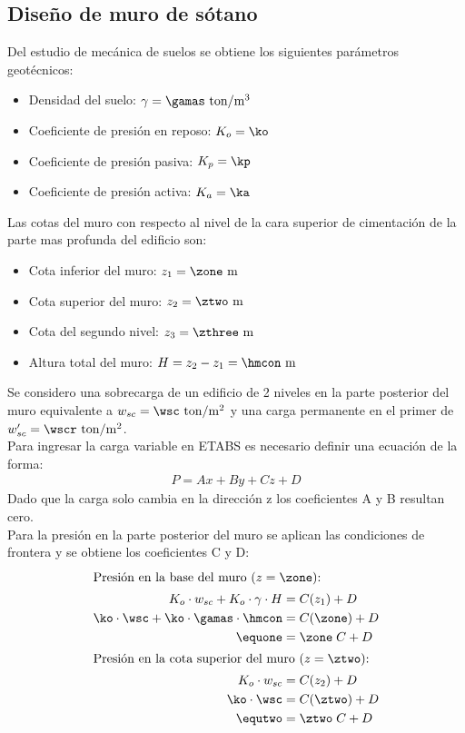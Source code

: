 \subsection{Diseño de muro de sótano}
Del estudio de mecánica de suelos se obtiene los siguientes parámetros geotécnicos:
\FPset{}
\FPset{}
\FPset{}
\FPset{}
\begin{itemize}
    \item Densidad del suelo: $\gamma =\gamas\mathrm{~ton/m^3}$
    \item Coeficiente de presión en reposo: $K_{o}=\ko$
    \item Coeficiente de presión pasiva: $K_{p}=\kp$
    \item Coeficiente de presión activa: $K_{a}=\ka$
\end{itemize}
Las cotas del muro con respecto al nivel de la cara superior de cimentación de la parte mas profunda del edificio son:
\FPset{}
\FPset{}
\FPset{}
\begin{itemize}
    \item Cota inferior del muro: $z_{1} =\zone\mathrm{~m}$
    \item Cota superior del muro: $z_{2}=\ztwo\mathrm{~m}$
    \item Cota del segundo nivel: $z_{3}=\zthree\mathrm{~m}$
    \item Altura total del muro: $H=z_{2}-z_{1}=\hmcon\mathrm{~m}$
\end{itemize}
\FPset{}
\FPset{}
Se considero una sobrecarga de un edificio de 2 niveles en la parte posterior del muro equivalente a $w_{sc}=\wsc\mathrm{~ton/m^2}$ y una carga permanente en el primer de $w_{sc}^{\prime}=\wscr\mathrm{~ton/m^2}$.\\
Para ingresar la carga variable en ETABS es necesario definir una ecuación de la forma:
\begin{align}
    P=Ax+By+Cz+D
\end{align}
Dado que la carga solo cambia en la dirección z los coeficientes A y B resultan cero.\\
Para la presión en la parte posterior del muro se aplican las condiciones de frontera y se obtiene los coeficientes C y D:
\begin{align}
\shortintertext{Presión en la base del muro ($z=\zone$):} K_{o}\cdot w_{sc}+K_{o}\cdot \gamma \cdot H&=C(z_{1})+D\notag\\
\ko\cdot \wsc+\ko\cdot \gamas \cdot \hmcon&=C(\zone)+D\notag\\
\equone&=\zone\; C+D\label{eq1}\\ \shortintertext{Presión en la cota superior del muro ($z=\ztwo$):}
K_{o}\cdot w_{sc}&=C(z_{2})+D\notag\\
\ko\cdot \wsc&=C(\ztwo)+D\notag\\
\equtwo&=\ztwo\; C+D\label{eq2}
\end{align}
